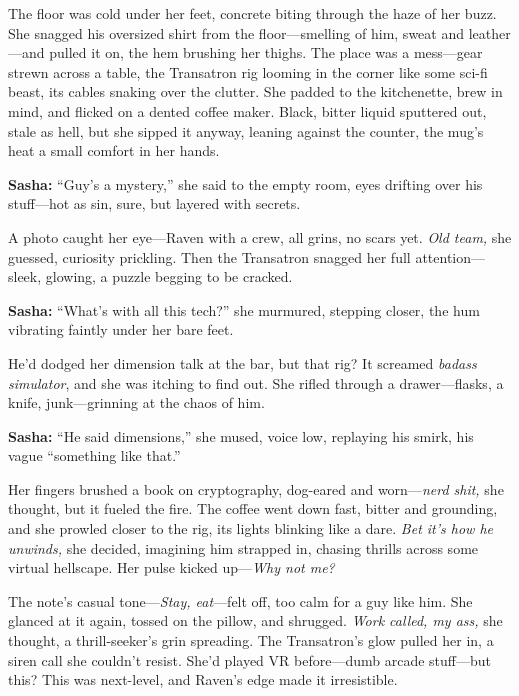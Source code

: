 \documentclass[12pt]{book}
\begin{document}
The floor was cold under her feet, concrete biting through the haze of her buzz. She snagged his oversized shirt from the floor—smelling of him, sweat and leather—and pulled it on, the hem brushing her thighs. The place was a mess—gear strewn across a table, the Transatron rig looming in the corner like some sci-fi beast, its cables snaking over the clutter. She padded to the kitchenette, brew in mind, and flicked on a dented coffee maker. Black, bitter liquid sputtered out, stale as hell, but she sipped it anyway, leaning against the counter, the mug’s heat a small comfort in her hands.

\vspace{0.5em}
\textbf{Sasha:} “Guy’s a mystery,” she said to the empty room, eyes drifting over his stuff—hot as sin, sure, but layered with secrets.

A photo caught her eye—Raven with a crew, all grins, no scars yet. \emph{Old team,} she guessed, curiosity prickling. Then the Transatron snagged her full attention—sleek, glowing, a puzzle begging to be cracked. 

\vspace{0.5em}
\textbf{Sasha:} “What’s with all this tech?” she murmured, stepping closer, the hum vibrating faintly under her bare feet.

He’d dodged her dimension talk at the bar, but that rig? It screamed \emph{badass simulator}, and she was itching to find out. She rifled through a drawer—flasks, a knife, junk—grinning at the chaos of him. 

\vspace{0.5em}
\textbf{Sasha:} “He said dimensions,” she mused, voice low, replaying his smirk, his vague “something like that.”

Her fingers brushed a book on cryptography, dog-eared and worn—\emph{nerd shit,} she thought, but it fueled the fire. The coffee went down fast, bitter and grounding, and she prowled closer to the rig, its lights blinking like a dare. \emph{Bet it’s how he unwinds,} she decided, imagining him strapped in, chasing thrills across some virtual hellscape. Her pulse kicked up—\emph{Why not me?}

The note’s casual tone—\emph{Stay, eat}—felt off, too calm for a guy like him. She glanced at it again, tossed on the pillow, and shrugged. \emph{Work called, my ass,} she thought, a thrill-seeker’s grin spreading. The Transatron’s glow pulled her in, a siren call she couldn’t resist. She’d played VR before—dumb arcade stuff—but this? This was next-level, and Raven’s edge made it irresistible. 
\end{document}
